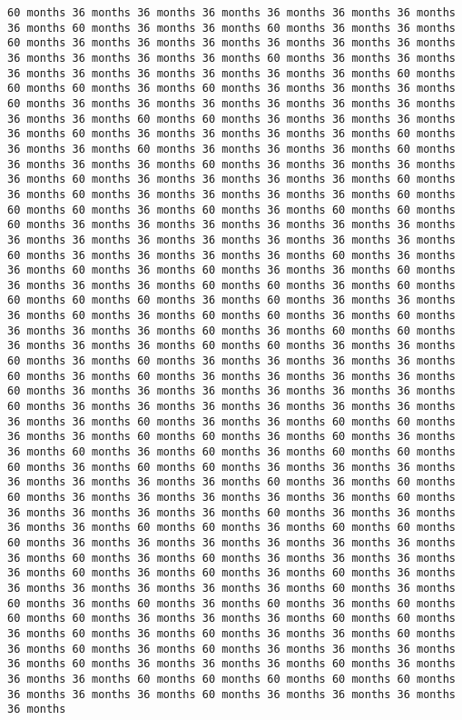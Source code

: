 \documentclass[11pt]{article}
\begin{document}
\begin{Verbatim}[commandchars=\\\{\}, frame=single, framerule=2mm, rulecolor=\color{outerrorbackground}]
60 months 36 months 36 months 36 months 36 months 36 months 36 months 36 months 60 months 36 months 36 months 60 months 36 months 36 months 60 months 36 months 36 months 36 months 36 months 36 months 36 months 36 months 36 months 36 months 36 months 60 months 36 months 36 months 36 months 36 months 36 months 36 months 36 months 36 months 60 months 60 months 60 months 36 months 60 months 36 months 36 months 36 months 60 months 36 months 36 months 36 months 36 months 36 months 36 months 36 months 36 months 60 months 60 months 36 months 36 months 36 months 36 months 60 months 36 months 36 months 36 months 36 months 60 months 36 months 36 months 60 months 36 months 36 months 36 months 60 months 36 months 36 months 36 months 60 months 36 months 36 months 36 months 36 months 60 months 36 months 36 months 36 months 36 months 60 months 36 months 60 months 36 months 36 months 36 months 36 months 60 months 60 months 60 months 36 months 60 months 36 months 60 months 60 months 60 months 36 months 36 months 36 months 36 months 36 months 36 months 36 months 36 months 36 months 36 months 36 months 36 months 36 months 60 months 36 months 36 months 36 months 36 months 60 months 36 months 36 months 60 months 36 months 60 months 36 months 36 months 60 months 36 months 36 months 36 months 60 months 60 months 36 months 60 months 60 months 60 months 60 months 36 months 60 months 36 months 36 months 36 months 60 months 36 months 60 months 60 months 36 months 60 months 36 months 36 months 36 months 60 months 36 months 60 months 60 months 36 months 36 months 36 months 60 months 60 months 36 months 36 months 60 months 36 months 60 months 36 months 36 months 36 months 36 months 60 months 36 months 60 months 36 months 36 months 36 months 36 months 60 months 36 months 36 months 36 months 36 months 36 months 36 months 60 months 36 months 36 months 36 months 36 months 36 months 36 months 36 months 36 months 60 months 36 months 36 months 60 months 60 months 36 months 36 months 60 months 60 months 36 months 60 months 36 months 36 months 60 months 36 months 60 months 36 months 60 months 60 months 60 months 36 months 60 months 60 months 36 months 36 months 36 months 36 months 36 months 36 months 36 months 60 months 36 months 60 months 60 months 36 months 36 months 36 months 36 months 36 months 60 months 36 months 36 months 36 months 36 months 60 months 36 months 36 months 36 months 36 months 60 months 60 months 36 months 60 months 60 months 60 months 36 months 36 months 36 months 36 months 36 months 36 months 36 months 60 months 36 months 60 months 36 months 36 months 36 months 36 months 60 months 36 months 60 months 36 months 60 months 36 months 36 months 36 months 36 months 36 months 36 months 60 months 36 months 60 months 36 months 60 months 36 months 60 months 36 months 60 months 60 months 60 months 36 months 36 months 36 months 60 months 60 months 36 months 60 months 36 months 60 months 36 months 36 months 60 months 36 months 60 months 36 months 60 months 36 months 36 months 36 months 36 months 60 months 36 months 36 months 36 months 60 months 36 months 36 months 36 months 60 months 60 months 60 months 60 months 60 months 36 months 36 months 36 months 60 months 36 months 36 months 36 months 36 months 
\end{Verbatim}
\end{document}
